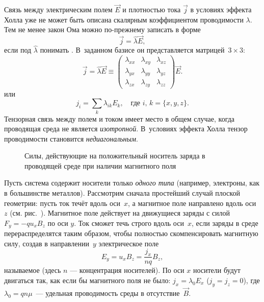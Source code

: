 
Связь между электрическим полем $\vec{E}$ и плотностью тока $\vec{j}$ в
условиях эффекта Холла уже не может быть описана скалярным коэффициентом проводимости
$\lambda$. Тем не менее закон Ома можно по-прежнему записать
в форме
\begin{equation}
\vec{j} = \hat{\lambda} \vec{E},
\end{equation}
если под $\hat{\lambda}$
понимать . В~заданном базисе он представляется
матрицей~$3\times 3$:
\begin{equation}
    \vec{j} =\hat{\lambda}\vec{E}\equiv \left(
    \begin{matrix}
     \lambda_{xx} & \lambda_{xy} & \lambda_{xz}\\
     \lambda_{yx} & \lambda_{yy} & \lambda_{yz}\\
     \lambda_{zx} & \lambda_{zy} & \lambda_{zz}
    \end{matrix}
\right) \vec{E}.
\end{equation}
или
\begin{equation*}
    j_{i} = \sum_{k} \lambda_{ik} E_k,\quad \text{где~}i,\,k=\{x,y,z\}.
\end{equation*}
Тензорная связь между полем и током имеет место в общем случае, когда
проводящая среда не является \emph{изотропной}.
В~условиях эффекта Холла тензор проводимости становится \emph{недиагональным}.


\begin{figure}[h!]
\centering
    \caption{Силы, действующие на положительный носитель заряда в проводящей среде
    при наличии магнитного поля}
\end{figure}

Пусть система содержит носители только \emph{одного типа}
(например, электроны, как в большинстве металлов).
Рассмотрим сначала простейший случай плоской геометрии:
пусть ток течёт вдоль оси~$x$, 
а магнитное поле направлено вдоль оси $z$ (см. рис.~).
Магнитное поле действует на движущиеся заряды с силой $F_y=-qu_xB_z$ по оси $y$.
Ток сможет течь строго вдоль оси~$x$, если заряды в среде перераспределятся 
таким образом, чтобы полностью скомпенсировать магнитную силу, 
создав в направлении~$y$ электрическое поле
\begin{equation*}
E_y=u_x B_z=\frac{j_x}{nq} B_z,
\end{equation*}
называемое  (здесь $n$ --- концентрация носителей).
По оси $x$ носители будут двигаться так, как если бы магнитного поля не было:
$j_x=\lambda_0 E_x$ ($j_y=j_z=0$), где $\lambda_0 = qn\mu$~---
удельная проводимость среды в отсутствие~$\vec{B}$.

